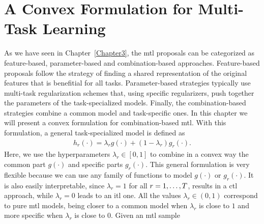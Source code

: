 
\chapter{A Convex Formulation for Multi-Task Learning} %
\label{Chapter4}

{\bf \small{

}}

As we have seen in Chapter~\ref{Chapter3}, the \acrfull{mtl} proposals can be categorized as feature-based, parameter-based and combination-based approaches. Feature-based proposals follow the strategy of finding a shared representation of the original features that is benefitial for all tasks. Parameter-based strategies typically use multi-task regularization schemes that, using specific regularizers, push together the parameters of the task-specialized models.
Finally, the combination-based strategies combine a common model and task-specific ones. 
%
In this chapter we will present a convex formulation for combination-based \acrshort{mtl}. With this formulation, a general task-specialized model is defined as
\begin{equation}
    \label{eq:convexmtl_general}
    \begin{aligned}
        h_r(\cdot)
       = \lambda_r g(\cdot) + (1 - \lambda_r) g_r(\cdot) .
    \end{aligned}    
\end{equation}
Here, we use the hyperparameters $\lambda_r \in [0, 1]$ to combine in a convex way the common part $g(\cdot)$ and specific parts $g_r(\cdot)$. This general formulation is very flexible because we can use any family of functions to model $g(\cdot)$ or $g_r(\cdot)$. It is also easily interpretable, since $\lambda_r=1$ for all $r=1, \ldots, T$, results in a \acrfull{ctl} approach, while $\lambda_r=0$ leads to an \acrfull{itl} one. All the values $\lambda_r \in (0, 1)$ correspond to pure \acrshort{mtl} models, being closer to a common model when $\lambda_r$ is close to $1$ and more specific when $\lambda_r$ is close to $0$.
%
Given an \acrshort{mtl} sample 
